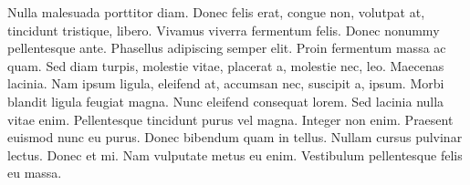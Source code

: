 \documentclass[a4paper]{article}
\begin{document}
	Nulla malesuada porttitor diam. Donec felis erat, congue non, volutpat at, 
	tincidunt tristique, libero. Vivamus viverra fermentum felis. Donec nonummy 
	pellentesque ante. Phasellus adipiscing semper elit. Proin fermentum massa ac 
	quam. Sed diam turpis, molestie vitae, placerat a, molestie nec, leo. 
	Maecenas lacinia. Nam ipsum ligula, eleifend at, accumsan nec, suscipit a, 
	ipsum. Morbi blandit ligula feugiat magna. Nunc eleifend consequat lorem. Sed 
	lacinia nulla vitae enim. Pellentesque tincidunt purus vel magna. Integer non 
	enim. Praesent euismod nunc eu purus. Donec bibendum quam in tellus. Nullam 
	cursus pulvinar lectus. Donec et mi. Nam vulputate metus eu enim. Vestibulum 
	pellentesque felis eu massa.
	
\end{document}
